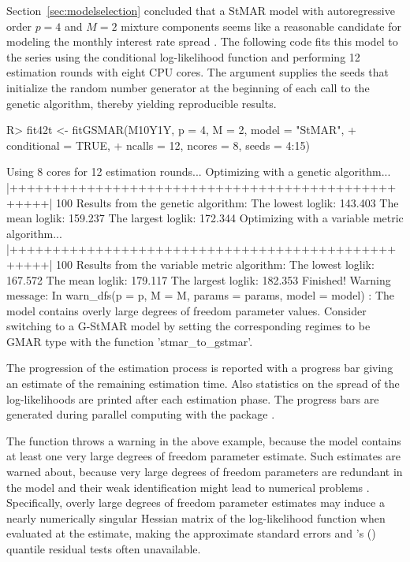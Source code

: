 \documentclass[nojss]{jss} %
\begin{document}
Section~\ref{sec:modelselection} concluded that a StMAR model with autoregressive order $p=4$ and $M=2$ mixture components seems like a reasonable candidate for modeling the monthly interest rate spread . The following code fits this model to the series using the conditional log-likelihood function and performing 12 estimation rounds with eight CPU cores. The argument  supplies the seeds that initialize the random number generator at the beginning of each call to the genetic algorithm, thereby yielding reproducible results.
%
\begin{CodeChunk}
\begin{CodeInput}
R> fit42t <- fitGSMAR(M10Y1Y, p = 4, M = 2, model = "StMAR",
+    conditional = TRUE,
+              ncalls = 12, ncores = 8, seeds = 4:15)
\end{CodeInput}
\begin{CodeOutput}
Using 8 cores for 12 estimation rounds...
Optimizing with a genetic algorithm...
  |++++++++++++++++++++++++++++++++++++++++++++++++++| 100%
Results from the genetic algorithm:
The lowest loglik:  143.403
The mean loglik:    159.237
The largest loglik: 172.344
Optimizing with a variable metric algorithm...
  |++++++++++++++++++++++++++++++++++++++++++++++++++| 100%
Results from the variable metric algorithm:
The lowest loglik:  167.572
The mean loglik:    179.117
The largest loglik: 182.353
Finished!
Warning message:
In warn_dfs(p = p, M = M, params = params, model = model) :
  The model contains overly large degrees of freedom parameter values.
  Consider switching to a G-StMAR model by setting the corresponding regimes
  to be GMAR type with the function 'stmar_to_gstmar'.
\end{CodeOutput}
\end{CodeChunk}
%
The progression of the estimation process is reported with a progress bar giving an estimate of the remaining estimation time. Also statistics on the spread of the log-likelihoods are printed after each estimation phase. The progress bars are generated during parallel computing with the package  \citep{Solymos+Zawadzki:2020}.

The function throws a warning in the above example, because the model contains at least one very large degrees of freedom parameter estimate. Such estimates are warned about, because very large degrees of freedom parameters are redundant in the model and their weak identification might lead to numerical problems \citep[Section 4]{Virolainen:2020}. Specifically, overly large degrees of freedom parameter estimates may induce a nearly numerically singular Hessian matrix of the log-likelihood function when evaluated at the estimate, making the approximate standard errors and  \citeauthor{Kalliovirta:2012}'s (\citeyear{Kalliovirta:2012}) quantile residual tests often unavailable.
\end{document}
